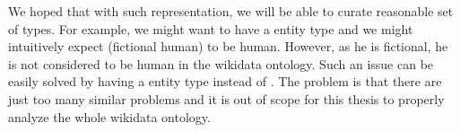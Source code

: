We hoped that with such representation, we will be able to curate reasonable set of types. For example, we might want to have a  entity type and we might intuitively expect  (fictional human) to be human. However, as he is fictional, he is not considered to be human in the wikidata ontology. Such an issue can be easily solved by having a  entity type instead of . The problem is that there are just too many similar problems and it is out of scope for this thesis to properly analyze the whole wikidata ontology. 


